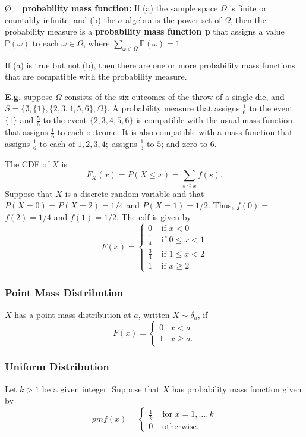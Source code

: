 \documentclass[13pt]{article}
\theoremstyle{definition}
\theoremstyle{remark}
\newenvironment{remark}
  {\pushQED{\qed}\renewcommand{\qedsymbol}{$\triangle$}\remarkx}
  {\popQED\endremarkx}
\newenvironment{point}
  {\O~~}
  {}
\newcommand{\PP}{\mathbb{P}}
\begin{document}
\begin{point}
    \textbf{probability mass function:} If (a) the sample space $\Omega$ is finite or countably infinite; and (b) the $\sigma$-algebra is the power set of $\Omega$, then the probability measure is a \textbf{probability mass function p} that assigns a value $\PP(\omega)$ to each $\omega\in\Omega$, where $\sum_{\omega\in\Omega}\PP(\omega)=1$.

    If (a) is true but not (b), then there are one or more probability mass functions that are compatible with the probability measure.

    \textbf{E.g.} suppose $\Omega$ consists of the six outcomes of the throw of a single die, and $S=\{\emptyset,\{1\},\{2,3,4,5,6\},\Omega\}$. A probability measure that assigns $\frac{1}{6}$ to the event $\{1\}$ and $\frac{5}{6}$ to the event $\{2,3,4,5,6\}$ is compatible with the usual mass function that assigns $\frac{1}{6}$ to each outcome. It is also compatible with a mass function that assigns $\frac{1}{6}$ to each of $1,2,3,4;$ assigns $\frac{1}{3}$ to $5$; and zero to $6$.
\end{point}

The CDF of $X$ is
\[
F_{X}(x)=P(X \leq x)=\sum_{s \leq x} f(s) .
\]
\begin{remark}
    Suppose that $X$ is a discrete random variable and that $P(X=0)=P(X=2)=1 / 4$ and $P(X=1)=1 / 2$. Thus, $f(0)=$ $f(2)=1 / 4$ and $f(1)=1 / 2$. The cdf is given by
\[
F(x)= \begin{cases}0 & \text { if } x<0 \\ \frac{1}{4} & \text { if } 0 \leq x<1 \\ \frac{3}{4} & \text { if } 1 \leq x<2 \\ 1 & \text { if } x \geq 2\end{cases}
\]
\end{remark}
\subsubsection{Point Mass Distribution}
$X$ has a point mass distribution at $a$, written $X \sim \delta_{a}$, if
\[
F(x)= \begin{cases}0 & x<a \\ 1 & x \geq a .\end{cases}
\]

\subsubsection{Uniform Distribution}Let $k>1$ be a given integer. Suppose that $X$ has probability mass function given by
\[
pmf(x)= \begin{cases}\frac{1}{k} & \text { for } x=1, \ldots, k \\ 0 & \text { otherwise. }\end{cases}
\]
\end{document}
